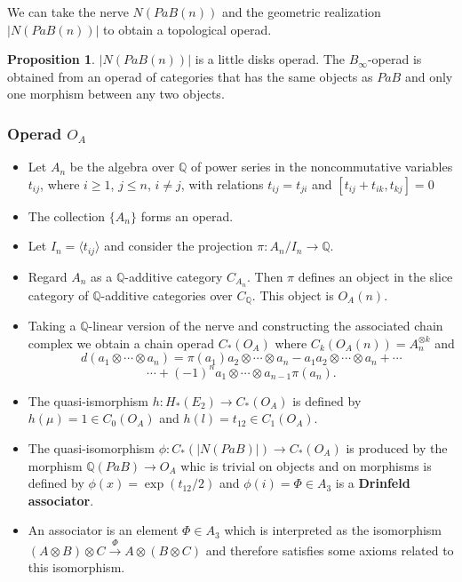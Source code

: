 \documentclass{beamer}
\theoremstyle{definition}
\newtheorem{prop}[teorema]{Proposition}
\newcommand{\Q}{\mathbb{Q}}
\providecommand{\gene}[1]{\langle{#1}\rangle}
\begin{document}
\begin{frame}
 We can take the nerve $N(PaB(n))$ and the geometric realization $|N(PaB(n))|$ to obtain a topological operad.\pause
 \begin{prop}
 	$|N(PaB(n))|$ is a little disks operad. The $B_\infty$-operad is obtained from an operad of categories that has the same objects as $PaB$ and only one morphism between any two objects.
 \end{prop}
\end{frame}
 
\begin{frame}
	\frametitle{Operad $O_A$}
	\begin{itemize}
		\item<1-> Let $A_n$ be the algebra over $\Q$ of power series in the noncommutative variables $t_{ij}$, where $i\geq 1$, $j\leq n$, $i\neq j$, with relations $t_{ij}=t_{ji}$ and $[t_{ij}+t_{ik},t_{kj}]=0$
		\item<2-> The collection $\{A_n\}$ forms an operad. 
		\item<3-> Let $I_n=\gene{t_{ij}}$ and consider the projection $\pi:A_n/I_n\to\Q$. 
		\item<4-> Regard $A_n$ as a $\Q$-additive category $C_{A_n}$. Then $\pi$ defines an object in the slice category of $\Q$-additive categories over $C_\Q$. This object is $O_A(n)$. 
	\end{itemize}
\end{frame}
\begin{frame}
	\begin{itemize}
		\item<1-> Taking a $\Q$-linear version of the nerve and constructing the associated chain complex we obtain a chain operad $C_*(O_A)$ where $C_k(O_A(n))=A_n^{\otimes k}$ and
		$$
		d(a_1\otimes\cdots\otimes a_n)=\pi(a_1)a_2\otimes\cdots\otimes a_n-a_1a_2\otimes \cdots\otimes a_n+\cdots$$ $$\cdots+(-1)^{n}a_1\otimes\cdots\otimes a_{n-1}\pi(a_n).$$
		
		\item<2-> The quasi-ismorphism $h:H_*(E_2)\to C_*(O_A)$ is defined by $h(\mu)=1\in C_0(O_A)$ and $h(l)=t_{12}\in C_1(O_A)$. %
		\item<3-> The quasi-isomorphism $\phi:C_*(|N(PaB)|)\to C_*(O_A)$ is produced by the morphism $\Q(PaB)\to O_A$ whic is trivial on objects and on morphisms is defined by $\phi(x)=\exp(t_{12}/2)$ and $\phi(i)=\Phi\in A_3$ is a \textbf{Drinfeld associator}. 
		\item<4-> An associator is an element $\Phi\in A_3$ which is interpreted as the isomorphism $(A\otimes B)\otimes C\xrightarrow{\Phi} A\otimes (B\otimes C)$ and therefore satisfies some axioms related to this isomorphism. %
		 
	\end{itemize}
\end{frame}
	
\end{document}
